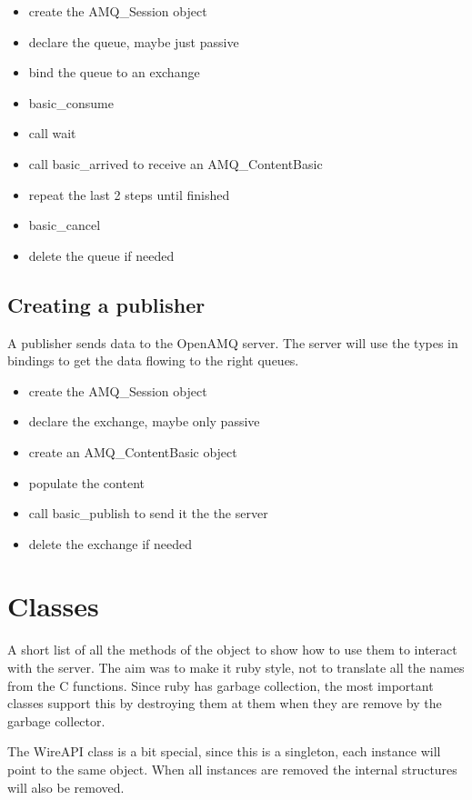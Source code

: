 \documentclass[a4paper,twoside]{article}
\begin{document}
\begin{itemize}
  \item create the AMQ\_Session object
  \item declare the queue, maybe just passive
  \item bind the queue to an exchange
  \item basic\_consume
  \item call wait
  \item call basic\_arrived to receive an AMQ\_ContentBasic
  \item repeat the last 2 steps until finished
  \item basic\_cancel
  \item delete the queue if needed
\end{itemize}


\subsection{Creating a publisher}
A publisher sends data to the OpenAMQ server. The server
will use the types in bindings to get the data flowing to
the right queues.

\begin{itemize}
  \item create the AMQ\_Session object
  \item declare the exchange, maybe only  passive
  \item create an AMQ\_ContentBasic object
  \item populate the content
  \item call basic\_publish to send it the the server
  \item delete the exchange if needed
\end{itemize}




\section{Classes}

A short list of all the methods of the object to show 
how to use them to interact with the server. The aim 
was to make it ruby style, not to translate all the names 
from the C functions. Since ruby has garbage collection, 
the most important classes support this by destroying them 
at them when they are remove by the garbage collector.

The WireAPI class is a bit special, since this is a
singleton, each instance will point to the same object.
When all instances are removed the internal structures
will also be removed.
\end{document}
